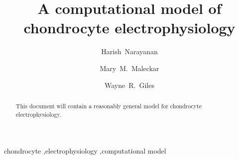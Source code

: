 \begin{frontmatter}

\title{A computational model of chondrocyte electrophysiology}

\author[srl]{Harish~Narayanan}
\author[srl]{Mary~M.~Maleckar}
\author[ucal]{Wayne~R.~Giles}

\address[srl]{Center for Biomedical Computing, Simula Research
  Laboratory, P.O.~Box~134, 1325~Lysaker, Norway}

\address[ucal]{Faculty of Kinesiology, University of Calgary, Calgary,
  Alberta, Canada T2N 4N1}

\begin{abstract}
  This document will contain a reasonably general model for
  chondrocyte electrophysiology.
\end{abstract}

\begin{keyword}
chondrocyte \sep electrophysiology \sep computational model
\end{keyword}

\end{frontmatter}

